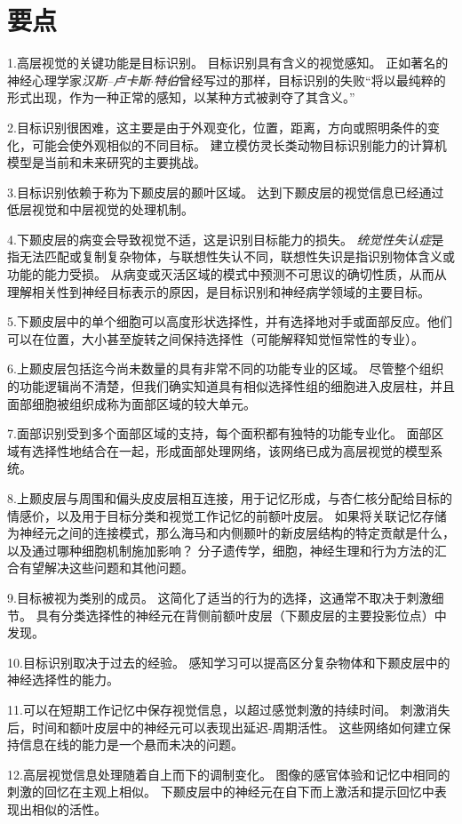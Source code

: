 \section{要点}

1.高层视觉的关键功能是目标识别。
目标识别具有含义的视觉感知。
正如著名的神经心理学家\textit{汉斯–卢卡斯$\cdot$特伯}曾经写过的那样，目标识别的失败“将以最纯粹的形式出现，作为一种正常的感知，以某种方式被剥夺了其含义。” 


2.目标识别很困难，这主要是由于外观变化，位置，距离，方向或照明条件的变化，可能会使外观相似的不同目标。
建立模仿灵长类动物目标识别能力的计算机模型是当前和未来研究的主要挑战。


3.目标识别依赖于称为下颞皮层的颞叶区域。
达到下颞皮层的视觉信息已经通过低层视觉和中层视觉的处理机制。


4.下颞皮层的病变会导致视觉不适，这是识别目标能力的损失。
\textit{统觉性失认症}是指无法匹配或复制复杂物体，与联想性失认不同，联想性失识是指识别物体含义或功能的能力受损。
从病变或灭活区域的模式中预测不可思议的确切性质，从而从理解相关性到神经目标表示的原因，是目标识别和神经病学领域的主要目标。 


5.下颞皮层中的单个细胞可以高度形状选择性，并有选择地对手或面部反应。他们可以在位置，大小甚至旋转之间保持选择性（可能解释知觉恒常性的专业）。


6.上颞皮层包括迄今尚未数量的具有非常不同的功能专业的区域。
尽管整个组织的功能逻辑尚不清楚，但我们确实知道具有相似选择性组的细胞进入皮层柱，并且面部细胞被组织成称为面部区域的较大单元。


7.面部识别受到多个面部区域的支持，每个面积都有独特的功能专业化。
面部区域有选择性地结合在一起，形成面部处理网络，该网络已成为高层视觉的模型系统。


8.上颞皮层与周围和偏头皮皮层相互连接，用于记忆形成，与杏仁核分配给目标的情感价，以及用于目标分类和视觉工作记忆的前额叶皮层。
如果将关联记忆存储为神经元之间的连接模式，那么海马和内侧颞叶的新皮层结构的特定贡献是什么，以及通过哪种细胞机制施加影响？
分子遗传学，细胞，神经生理和行为方法的汇合有望解决这些问题和其他问题。


9.目标被视为类别的成员。
这简化了适当的行为的选择，这通常不取决于刺激细节。
具有分类选择性的神经元在背侧前额叶皮层（下颞皮层的主要投影位点）中发现。


10.目标识别取决于过去的经验。
感知学习可以提高区分复杂物体和下颞皮层中的神经选择性的能力。


11.可以在短期工作记忆中保存视觉信息，以超过感觉刺激的持续时间。
刺激消失后，时间和额叶皮层中的神经元可以表现出延迟-周期活性。
这些网络如何建立保持信息在线的能力是一个悬而未决的问题。


12.高层视觉信息处理随着自上而下的调制变化。
图像的感官体验和记忆中相同的刺激的回忆在主观上相似。
下颞皮层中的神经元在自下而上激活和提示回忆中表现出相似的活性。


